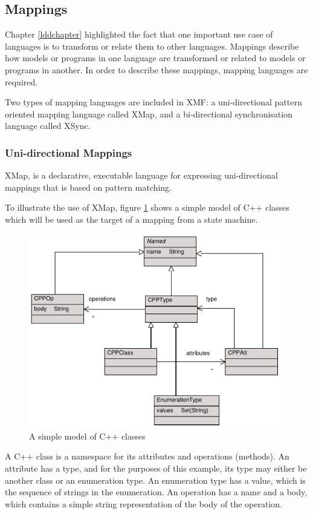 \subsection{Mappings}

Chapter \ref{lddchapter} highlighted the fact that one important
use case of languages is to transform or relate them to other
languages. Mappings describe how models or programs in one
language are transformed or related to models or programs in
another. In order to describe these mappings, mapping languages
are required.

Two types of mapping languages are included in XMF: a
uni-directional pattern oriented mapping language called XMap, and
a bi-directional synchronisation language called XSync.

\subsubsection{Uni-directional Mappings}

XMap, is a declarative, executable language for expressing
uni-directional mappings that is based on pattern matching.

To illustrate the use of XMap, figure \ref{cppExample} shows a
simple model of {C++} classes which will be used as the target of a
mapping from a state machine.

\begin{figure}[htb]
\begin{center}
\includegraphics[width=11cm]{XMF/figures/cppSimple}
\caption{A simple model of C++ classes}
\label{cppExample}
\end{center}
\end{figure}

A {C++} class is a namespace for its attributes and operations
(methods). An attribute has a type, and for the purposes of this
example, its type may either be another class or an enumeration
type. An enumeration type has a value, which is the sequence of
strings in the enumeration. An operation has a name and a body,
which contains a simple string representation of the body of the
operation.

